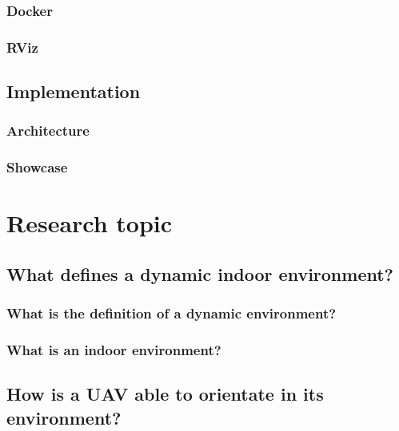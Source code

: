 \documentclass[12pt, a4paper]{report}
\begin{document}
      \subsection{Docker}
      
      \subsection{RViz}
      
      \clearpage
    \section{Implementation}
    
      \subsection{Architecture}
      
      \clearpage
      \subsection{Showcase}
      

  \chapter{Research topic}
  
  \clearpage
    \section{What defines a dynamic indoor environment?}
    
      \subsection{What is the definition of a dynamic environment?}
      
      \subsection{What is an indoor environment?}
      
      \clearpage
    \section{How is a UAV able to orientate in its environment?}
    
\end{document}
